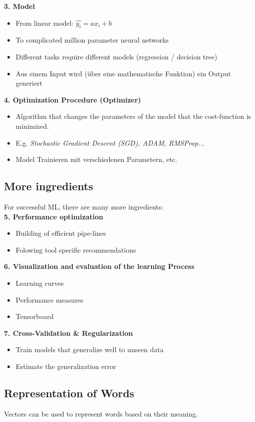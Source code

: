 \textbf{3. Model}
\begin{itemize}
    \item From linear model: $\hat{y_i} = ax_i + b$
    \item To complicated million parameter neural networks
    \item Different tasks require different models (regression / decision tree)
    \item Aus einem Input wird (über eine mathematische Funktion) ein Output generiert
\end{itemize}
\textbf{4. Optimization Procedure (Optimizer)}
\begin{itemize}
    \item Algorithm that changes the parameters of the model that the cost-function is minimized.
    \item E.g. \textit{Stochastic Gradient Descent (SGD), ADAM, RMSProp...}
    \item Model Trainieren mit verschiedenen Parametern, etc.
\end{itemize}

\subsection{More ingredients}
For successful ML, there are many more ingredients:\\ 
\textbf{5. Performance optimization}
\begin{itemize}
    \item Building of efficient pipe-lines
    \item Folowing tool specific recommendations
\end{itemize}
\textbf{6. Visualization and evaluation of the learning Process}
\begin{itemize}
    \item Learning curves
    \item Performance measures
    \item Tensorboard
\end{itemize}
\textbf{7. Cross-Validation \& Regularization}
\begin{itemize}
    \item Train models that generalize well to unseen data
    \item Estimate the generalization error
\end{itemize}

\subsection{Representation of Words}
Vectors can be used to represent words based on their meaning.
